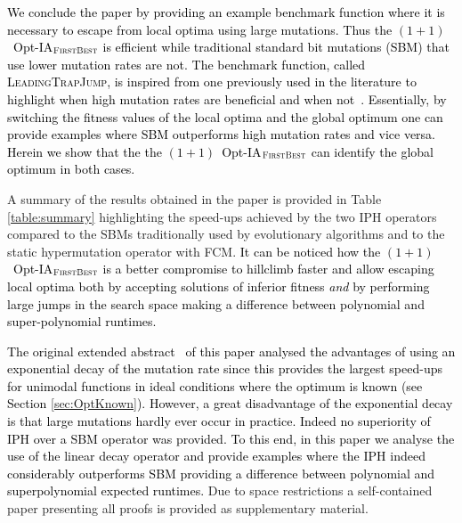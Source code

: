 \documentclass[lettersize,journal]{IEEEtran}
\newcommand{\new}[1]{\textcolor{black}{#1}}
\begin{document}
\new{We conclude the paper by providing an example benchmark function where it is necessary to escape from local optima using large mutations. Thus the $(1+1)$~Opt-IA$_{\textsc{FirstBest}}$ is efficient while traditional standard bit mutations (SBM) that use lower mutation rates are not. The benchmark function, called \textsc{LeadingTrapJump}, is inspired from one previously used in the literature to highlight when high mutation rates are beneficial and when not~\cite{OlivetoLehreNeumann09}. Essentially, by switching the fitness values of the local optima and the global optimum one can provide examples where SBM outperforms high mutation rates and vice versa. Herein we show that the the $(1+1)$~Opt-IA$_{\textsc{FirstBest}}$ can identify the global optimum in both cases.}



A summary of the results obtained in the paper is provided in Table \ref{table:summary} highlighting the speed-ups achieved by the two IPH operators compared to the SBMs traditionally  used by evolutionary algorithms and to the static hypermutation operator with FCM.
\new{It can be noticed how the $(1+1)$~Opt-IA$_{\textsc{FirstBest}}$ is a better compromise to hillclimb faster and allow escaping local optima both by accepting solutions of inferior fitness {\it and} by performing large jumps in the search space making a difference between polynomial and super-polynomial runtimes.}

\new{The original extended abstract~\cite{CorusOlivetoYazdaniIPH2019} of this paper analysed the advantages of using an exponential decay of the mutation rate since this provides the largest speed-ups for unimodal functions in ideal conditions where the optimum is known (see Section \ref{sec:OptKnown}). However, a great disadvantage of the exponential decay is that large mutations hardly ever occur in practice. Indeed no superiority of IPH over a SBM operator was provided.  To this end, in this paper we analyse the use of the linear decay operator and  provide examples where the IPH indeed considerably outperforms SBM providing a difference between polynomial and superpolynomial expected runtimes.}
Due to space restrictions a self-contained paper presenting all proofs is provided as supplementary material.



 
 
 
\end{document}
